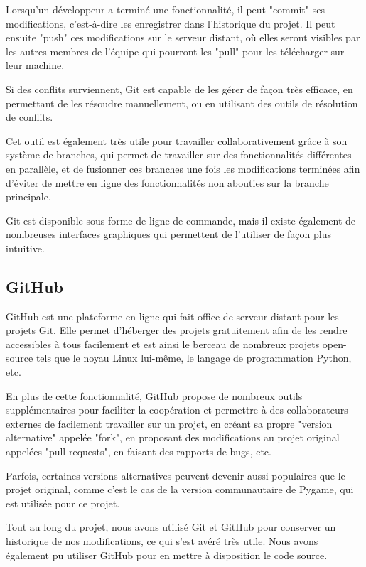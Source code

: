 \documentclass[12pt]{scrreprt} %
\begin{document}
Lorsqu'un développeur a terminé une fonctionnalité, il peut "commit" ses modifications, c'est-à-dire les enregistrer dans l'historique du projet. Il peut ensuite "push" ces modifications sur le serveur distant, où elles seront visibles par les autres membres de l'équipe qui pourront les "pull" pour les télécharger sur leur machine.

Si des conflits surviennent, Git est capable de les gérer de façon très efficace, en permettant de les résoudre manuellement, ou en utilisant des outils de résolution de conflits.

Cet outil est également très utile pour travailler collaborativement grâce à son système de branches, qui permet de travailler sur des fonctionnalités différentes en parallèle, et de fusionner ces branches une fois les modifications terminées afin d'éviter de mettre en ligne des fonctionnalités non abouties sur la branche principale.

Git est disponible sous forme de ligne de commande, mais il existe également de nombreuses interfaces graphiques qui permettent de l'utiliser de façon plus intuitive.

\subsection{GitHub}

GitHub est une plateforme en ligne qui fait office de serveur distant pour les projets Git. Elle permet d'héberger des projets gratuitement afin de les rendre accessibles à tous facilement et est ainsi le berceau de nombreux projets open-source tels que le noyau Linux lui-même\cite{LinuxGithub2024}, le langage de programmation Python\cite{PythonGithub2024}, etc.

En plus de cette fonctionnalité, GitHub propose de nombreux outils supplémentaires pour faciliter la coopération et permettre à des collaborateurs externes de facilement travailler sur un projet, en créant sa propre "version alternative" appelée "fork", en proposant des modifications au projet original appelées "pull requests", en faisant des rapports de bugs, etc.

Parfois, certaines versions alternatives peuvent devenir aussi populaires que le projet original, comme c'est le cas de la version communautaire de Pygame, qui est utilisée pour ce projet.

Tout au long du projet, nous avons utilisé Git et GitHub pour conserver un historique de nos modifications, ce qui s'est avéré très utile. Nous avons également pu utiliser GitHub pour en mettre à disposition le code source.
\end{document}
